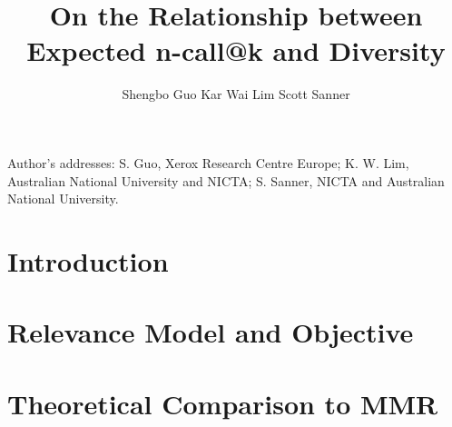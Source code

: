 \documentclass[prodmode,acmtecs]{acmsmall}
\begin{document}


\title{On the Relationship between Expected n-call@k and Diversity}
\author{Shengbo Guo
Kar Wai Lim
Scott Sanner
}

\begin{abstract}

\end{abstract}





\begin{bottomstuff}
Author's addresses: S. Guo, Xerox Research Centre Europe; K. W. Lim, Australian National University and NICTA; S. Sanner, NICTA and Australian National University.
\end{bottomstuff}

\maketitle



\section{Introduction}
\label{sec:intro}


\section{Relevance Model and Objective}
\label{sec:model}


\section{Theoretical Comparison to MMR}
\label{sec:theory}

\end{document}
